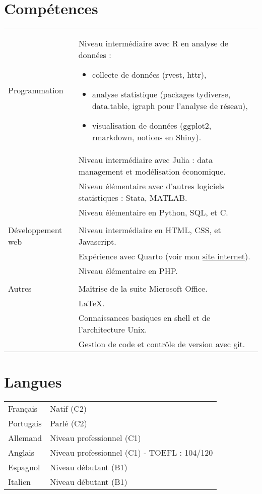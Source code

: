 \documentclass[a4paper,12pt]{article}
\begin{document}
\section{Compétences}
\begin{tabularx}{\linewidth}{@{}l X@{}}
Programmation & 
Niveau intermédiaire avec R en analyse de données :
\begin{itemize}
\item collecte de données (rvest, httr),
\item analyse statistique (packages tydiverse, data.table, igraph pour l'analyse de réseau),
\item visualisation de données (ggplot2, rmarkdown, notions en Shiny).
\end{itemize} \\
& Niveau intermédiaire avec Julia : data management et modélisation économique.\\
& Niveau élémentaire avec d'autres logiciels statistiques : Stata, MATLAB. \\
& Niveau élémentaire en Python, SQL, et C. \\
& \\
Développement web &  Niveau intermédiaire en HTML, CSS, et Javascript. \\
& Expérience avec Quarto (voir mon \href{https://www.paulogcd.com}{site internet}). \\
& Niveau élémentaire en PHP.\\
& \\
Autres & Maîtrise de la suite Microsoft Office. \\
&  \LaTeX. \\
& Connaissances basiques en shell et de l'architecture Unix. \\
& Gestion de code et contrôle de version avec git.\\
\end{tabularx}

\section{Langues}
\begin{tabularx}{\linewidth}{@{}l X@{}}
Français &  \normalsize{Natif (C2)}\\
Portugais &  \normalsize{Parlé (C2)}\\
Allemand &  \normalsize{Niveau professionnel (C1)}\\  
Anglais &  \normalsize{Niveau professionnel (C1) - TOEFL : 104/120}\\ 
Espagnol & \normalsize{Niveau débutant (B1)}\\ 
Italien & \normalsize{Niveau débutant (B1)}\\ 
\end{tabularx}

\vfill
{}
\end{document}
